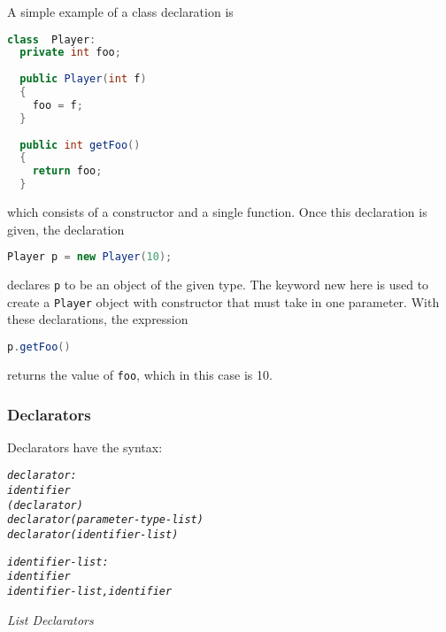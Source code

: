 \documentclass[12pt]{report}
\begin{document}
A simple example of a class declaration is

\begin{singlespace}
\begin{lstlisting}[language=Java,label=some-code,caption=Class declaration]
class  Player: 
  private int foo;
  
  public Player(int f)
  {
    foo = f;
  }
  
  public int getFoo()
  {
    return foo;
  }
\end{lstlisting}
\end{singlespace}

which consists of a constructor and a single function. Once this declaration is given, the declaration

\begin{singlespace}
\begin{lstlisting}[language=Java,label=some-code,caption=Object declaration]
Player p = new Player(10);
\end{lstlisting}
\end{singlespace}

declares \texttt{p} to be an object of the given type. The keyword new here is used to create a \texttt{Player} object with constructor that must take in one parameter. With these declarations, the expression

\begin{singlespace}
\begin{lstlisting}[language=Java,label=some-code,caption=Returns foo]
p.getFoo()
\end{lstlisting}
\end{singlespace}

returns the value of \texttt{foo}, which in this case is 10. 

\subsubsection{Declarators}

Declarators have the syntax:

\begin{alltt}\begin{singlespace}
         \textit{declarator:}
              \textit{identifier}
              \textit{( declarator )}
              \textit{declarator ( parameter-type-list )}
              \textit{declarator ( identifier-list )}
              
         \textit{identifier-list:}
              \textit{identifier}
              \textit{identifier-list, identifier}\end{singlespace}
\end{alltt}
\textit{List Declarators}
\end{document}
